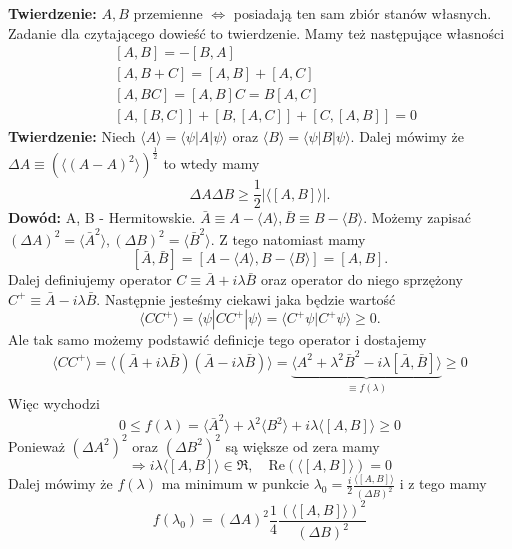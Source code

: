 \textbf{Twierdzenie:} $A, B$ przemienne $\iff$ posiadają ten sam zbiór stanów własnych. Zadanie dla czytającego dowieść to twierdzenie.
Mamy też następujące własności
\begin{equation}
	\begin{split}
		&[A, B] = - [B, A] \\
		&[A, B+C] = [A, B] + [A, C] \\
		&[A, BC] = [A,B]C = B[A,C] \\
		&[A,[B,C]] + [B,[A,C]] + [C,[A,B]] = 0
	\end{split}
\end{equation}
\textbf{Twierdzenie:} Niech $\langle A\rangle=\langle\psi| A|\psi\rangle$ oraz $\langle B\rangle=\langle\psi| B|\psi\rangle$. Dalej mówimy że $\Delta A \equiv (\langle (A - A)^2\rangle)^{\frac12}$ to wtedy mamy $$\Delta A \Delta B \geq \frac12 |\langle [A, B] \rangle|.$$
\textbf{Dowód:} A, B - Hermitowskie. $\bar{A} \equiv A-\langle A\rangle,  \bar{B} \equiv B-\langle B\rangle $. 
Możemy zapisać $ (\Delta A)^{2}=\langle\bar{A}^{2}\rangle,  (\Delta B)^{2}=\langle\bar{B}^{2}\rangle $. 
Z tego natomiast mamy $$ [\bar{A}, \bar{B}]=[A-\langle A\rangle, B-\langle B\rangle]=[A, B].$$ 
Dalej definiujemy operator $C \equiv \bar{A}+i \lambda \bar{B}$ oraz operator do niego sprzężony $C^+ \equiv \bar{A}-i \lambda \bar{B}$. 
Następnie jesteśmy ciekawi jaka będzie wartość $$  \langle C C^{+}\rangle=\langle\psi| C C^{+}|\psi\rangle= \langle C^{+} \psi|C^{+} \psi\rangle \geqslant 0  .$$
Ale tak samo możemy podstawić definicje tego operator i dostajemy
\begin{equation*}
	\langle C C^{+}\rangle =\langle (\bar{A}+ i \lambda \bar{B}) (\bar{A}-i \lambda \bar{B})\rangle  =\underbrace{\langle A^{2}+\lambda^{2} \bar{B}^{2}-i\lambda[\bar{A}, \bar{B}]\rangle}_{\equiv f(\lambda)} \geqslant 0 
\end{equation*}
Więc wychodzi
\begin{equation*}
	0 \leq f(\lambda) = \langle\bar{A}^{2}\rangle + \lambda^{2}\langle B^{2}\rangle + i\lambda\langle[A, B]\rangle \geq 0 
\end{equation*}
Ponieważ $(\Delta A^2)^2$ oraz $(\Delta B^2)^2$ są większe od zera mamy
\begin{equation*}
	\Rightarrow i \lambda \langle[A, B]\rangle \in \Re, \quad \text{Re}(\langle[A, B]\rangle) = 0
\end{equation*}
Dalej mówimy że $f(\lambda)$ ma minimum w punkcie $\lambda_0  = \frac{i}{2} \frac{\langle[A, B]\rangle}{(\Delta B)^2}$ i z tego mamy
\begin{equation*}
	f(\lambda_0)  = (\Delta A)^2 \frac{1}{4} \frac{(\langle[A, B]\rangle)^2}{(\Delta B)^2}
\end{equation*}
